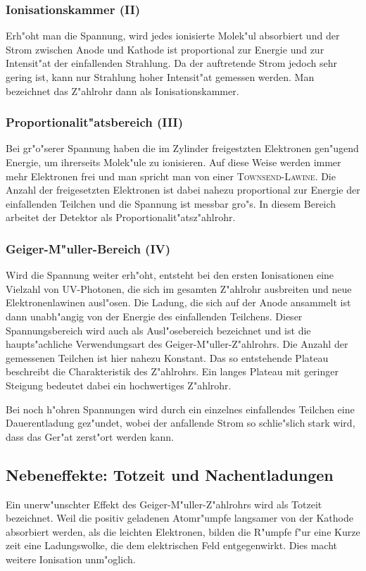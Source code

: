 		\subsubsection{Ionisationskammer (II)}
		\label{subsubsec:ionisationskammer}
			Erh"oht man die Spannung, wird jedes ionisierte Molek"ul absorbiert und der Strom zwischen Anode und Kathode ist proportional zur Energie und zur Intensit"at der einfallenden Strahlung.
			Da der auftretende Strom jedoch sehr gering ist, kann nur Strahlung hoher Intensit"at gemessen werden.
			Man bezeichnet das Z"ahlrohr dann als Ionisationskammer.

		\subsubsection{Proportionalit"atsbereich (III)}
		\label{subsubsec:proportionalitaetsbereich}
			Bei gr"o"serer Spannung haben die im Zylinder freigestzten Elektronen gen"ugend Energie, um ihrerseits Molek"ule zu ionisieren.
			Auf diese Weise werden immer mehr Elektronen frei und man spricht man von einer \textsc{Townsend-Lawine}.
			Die Anzahl der freigesetzten Elektronen ist dabei nahezu proportional zur Energie der einfallenden Teilchen und die Spannung ist messbar gro"s.
			In diesem Bereich arbeitet der Detektor als Proportionalit"atsz"ahlrohr.

		\subsubsection{Geiger-M"uller-Bereich (IV)}
		\label{subsubsec:geiger-mueller-bereich}
			Wird die Spannung weiter erh"oht, entsteht bei den ersten Ionisationen eine Vielzahl von UV-Photonen, die sich im gesamten Z"ahlrohr ausbreiten und neue Elektronenlawinen ausl"osen.
			Die Ladung, die sich auf der Anode ansammelt ist dann unabh"angig von der Energie des einfallenden Teilchens.
			Dieser Spannungsbereich wird auch als Ausl"osebereich bezeichnet und ist die haupts"achliche Verwendungsart des Geiger-M"uller-Z"ahlrohrs.
			Die Anzahl der gemessenen Teilchen ist hier nahezu Konstant.
			Das so entstehende Plateau beschreibt die Charakteristik des Z"ahlrohrs.
			Ein langes Plateau mit geringer Steigung bedeutet dabei ein hochwertiges Z"ahlrohr.

			Bei noch h"ohren Spannungen wird durch ein einzelnes einfallendes Teilchen eine Dauerentladung gez"undet, wobei der anfallende Strom so schlie"slich stark wird, dass das Ger"at zerst"ort werden kann.

	\subsection{Nebeneffekte: Totzeit und Nachentladungen}
	\label{subsec:nebeneffekte}
		Ein unerw"unschter Effekt des Geiger-M"uller-Z"ahlrohrs wird als Totzeit bezeichnet.
		Weil die positiv geladenen Atomr"umpfe langsamer von der Kathode absorbiert werden, als die leichten Elektronen, bilden die R"umpfe f"ur eine Kurze zeit eine Ladungswolke, die dem elektrischen Feld entgegenwirkt.
		Dies macht weitere Ionisation unm"oglich.

